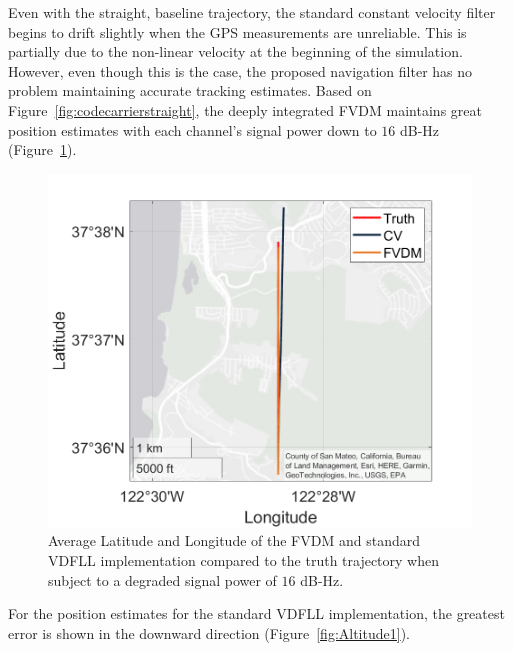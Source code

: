Even with the straight, baseline trajectory, the standard constant velocity filter begins to drift slightly when the GPS measurements are unreliable. This is partially due to the non-linear velocity at the beginning of the simulation. However, even though this is the case, the proposed navigation filter has no problem maintaining accurate tracking estimates. Based on Figure~\ref{fig:codecarrierstraight}, the deeply integrated FVDM maintains great position estimates with each channel's signal power down to \(16\) dB-Hz (Figure~\ref{fig:GEOPLOT2}).

\begin{figure}[!ht]
    \centering
    \includegraphics[width=0.5\linewidth]{Figures/straight/16/GEOPLOT.png}
    \caption{Average Latitude and Longitude of the FVDM and standard VDFLL implementation compared to the truth trajectory when subject to a degraded signal power of \(16\) dB-Hz.}\label{fig:GEOPLOT2}
\end{figure}

For the position estimates for the standard VDFLL implementation, the greatest error is shown in the downward direction (Figure~\ref{fig:Altitude1}).

